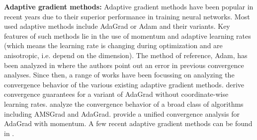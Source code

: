 \documentclass{article} %
\begin{document}
\textbf{Adaptive gradient methods:}  
Adaptive gradient methods have been popular in recent years due to their superior performance in training neural networks. 
Most used adaptive methods include AdaGrad \citep{duchi2011adaptive} or Adam \citep{kingma2014adam} and their variants.  
Key features of such methods lie in the use of momentum and adaptive learning rates (which means the learning rate is changing during optimization and are anisotropic, i.e. depend on the dimension).
The method of reference, Adam, has been analyzed in \citep{reddi2019convergence} where the authors point out an error in previous convergence analyses. 
Since then, a range of works have been focussing on analyzing the convergence behavior of the various existing adaptive gradient methods. 
\citet{ward2018adagrad, li2018convergence} derive convergence guarantees for a variant of AdaGrad without coordinate-wise learning rates. 
\citet{chen2018convergence} analyze the convergence behavior of a broad class of algorithms including AMSGrad \citep{reddi2019convergence} and AdaGrad. 
\citet{zou2018convergence} provide a unified convergence analysis for AdaGrad with momentum.
A few recent adaptive gradient methods can be found in \citep{agarwal2018case,luo2019adaptive,zaheer2018adaptive}.  
\end{document}
